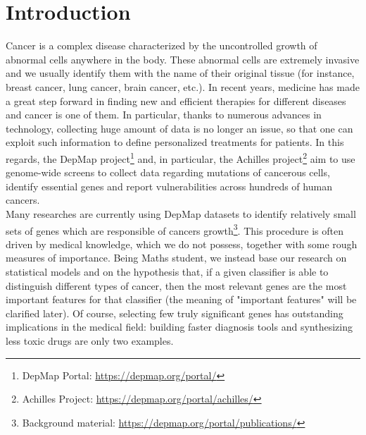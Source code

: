 \documentclass[a4paper,11pt, oneside]{article}  %
\begin{document}
\section{Introduction}
Cancer is a complex disease characterized by the uncontrolled growth of abnormal cells anywhere in the body. These abnormal cells are extremely invasive and we usually identify them with the name of their original tissue (for instance, breast cancer, lung cancer,  brain cancer, etc.).  In recent years, medicine has made a great step forward in finding new and efficient therapies for different diseases and cancer is one of them.  In particular,  thanks to numerous advances in technology,  collecting huge amount of data is no longer an issue, so that one can exploit such information to define personalized treatments for patients. In this regards, the DepMap project\footnote{DepMap Portal: \url{https://depmap.org/portal/} } and,  in particular,  the Achilles project\footnote{Achilles Project: \url{https://depmap.org/portal/achilles/} } aim to use genome-wide screens to collect data regarding mutations of cancerous cells,  identify essential genes and report vulnerabilities across hundreds of human cancers.  \\

Many researches are currently using DepMap datasets to identify relatively small sets of genes which are responsible of cancers growth\footnote{Background material: \url{https://depmap.org/portal/publications/}}. This procedure is often driven by medical knowledge,  which we do not possess,  together with some rough measures of importance.  Being Maths student,  we instead base our research on statistical models and on the hypothesis that, if a given classifier is able to distinguish different types of cancer, then the most relevant genes are the most important features for that classifier (the meaning of "important features" will be clarified later).  Of course,  selecting few truly significant genes has outstanding implications in the medical field: building faster diagnosis tools and synthesizing less toxic drugs are only two examples. 
\end{document}
